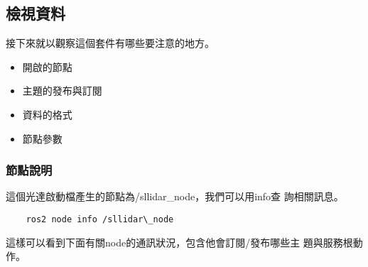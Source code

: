 \subsection{檢視資料}
接下來就以觀察這個套件有哪些要注意的地方。

\begin{itemize}
    \item 開啟的節點
    \item 主題的發布與訂閱
    \item 資料的格式
    \item 節點參數
\end{itemize}
\subsubsection{節點說明}
這個光達啟動檔產生的節點為/sllidar\_node，我們可以用info查
詢相關訊息。
\begin{tcolorbox}
\begin{verbatim}
    ros2 node info /sllidar\_node
\end{verbatim}
\end{tcolorbox}
這樣可以看到下面有關node的通訊狀況，包含他會訂閱/發布哪些主
題與服務根動作。

